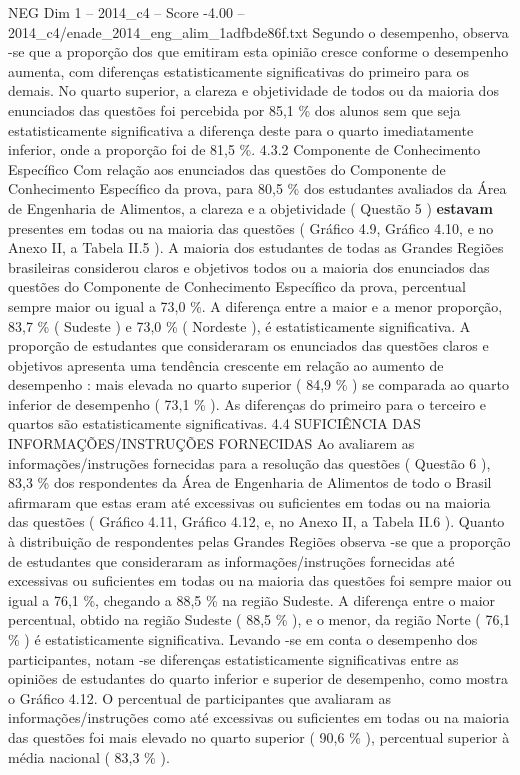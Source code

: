 \begin{textsample}{NEG Dim 1 – 2014\_c4 – Score -4.00 – 2014\_c4/enade\_2014\_eng\_alim\_1adfbde86f.txt}
Segundo o desempenho, observa -se que a proporção dos que emitiram esta opinião cresce conforme o desempenho aumenta, com diferenças estatisticamente significativas do primeiro para os demais.
No quarto superior, a clareza e objetividade de todos ou da maioria dos enunciados das questões foi percebida por 85,1 \% dos alunos sem que seja estatisticamente significativa a diferença deste para o quarto imediatamente inferior, onde a proporção foi de 81,5 \%. 4.3.2 Componente de Conhecimento Específico Com relação aos enunciados das questões do Componente de Conhecimento Específico da prova, para 80,5 \% dos estudantes avaliados da Área de Engenharia de Alimentos, a clareza e a objetividade ( Questão 5 ) \textbf{estavam} presentes em todas ou na maioria das questões ( Gráfico 4.9, Gráfico 4.10, e no Anexo II, a Tabela II.5 ).
A maioria dos estudantes de todas as Grandes Regiões brasileiras considerou claros e objetivos todos ou a maioria dos enunciados das questões do Componente de Conhecimento Específico da prova, percentual sempre maior ou igual a 73,0 \%.
A diferença entre a maior e a menor proporção, 83,7 \% ( Sudeste ) e 73,0 \% ( Nordeste ), é estatisticamente significativa.
A proporção de estudantes que consideraram os enunciados das questões claros e objetivos apresenta uma tendência crescente em relação ao aumento de desempenho : mais elevada no quarto superior ( 84,9 \% ) se comparada ao quarto inferior de desempenho ( 73,1 \% ).
As diferenças do primeiro para o terceiro e quartos são estatisticamente significativas. 4.4 SUFICIÊNCIA DAS INFORMAÇÕES/INSTRUÇÕES FORNECIDAS Ao avaliarem as informações/instruções fornecidas para a resolução das questões ( Questão 6 ), 83,3 \% dos respondentes da Área de Engenharia de Alimentos de todo o Brasil afirmaram que estas eram até excessivas ou suficientes em todas ou na maioria das questões ( Gráfico 4.11, Gráfico 4.12, e, no Anexo II, a Tabela II.6 ).
Quanto à distribuição de respondentes pelas Grandes Regiões observa -se que a proporção de estudantes que consideraram as informações/instruções fornecidas até excessivas ou suficientes em todas ou na maioria das questões foi sempre maior ou igual a 76,1 \%, chegando a 88,5 \% na região Sudeste.
A diferença entre o maior percentual, obtido na região Sudeste ( 88,5 \% ), e o menor, da região Norte ( 76,1 \% ) é estatisticamente significativa.
Levando -se em conta o desempenho dos participantes, notam -se diferenças estatisticamente significativas entre as opiniões de estudantes do quarto inferior e superior de desempenho, como mostra o Gráfico 4.12.
O percentual de participantes que avaliaram as informações/instruções como até excessivas ou suficientes em todas ou na maioria das questões foi mais elevado no quarto superior ( 90,6 \% ), percentual superior à média nacional ( 83,3 \% ).

\end{textsample}
